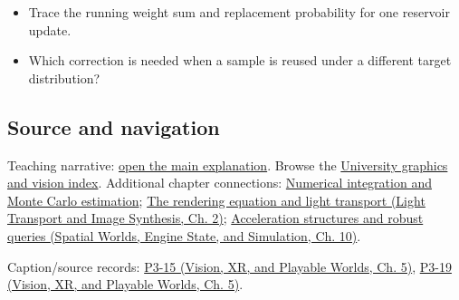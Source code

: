 \begin{itemize}
\tightlist
\item
  Trace the running weight sum and replacement probability for one reservoir update.
\item
  Which correction is needed when a sample is reused under a different target distribution?
\end{itemize}

\subsection{Source and navigation}\label{appendix-68be451b78b1-source-and-navigation}

Teaching narrative: \hyperref[03-visual-computing-i-ch012-numerical-integration-and-monte-carlo-estimation]{open the main explanation}. Browse the \hyperref[appendix-a6d556a4ef50-university-graphics-vision-and-photography---independent-series]{University graphics and vision index}. Additional chapter connections: \hyperref[03-visual-computing-i-ch012-numerical-integration-and-monte-carlo-estimation]{Numerical integration and Monte Carlo estimation}; \href{../04-Light-Transport-and-Image-Synthesis/main.pdf\#nameddest=03-visual-computing-i-ch007-the-rendering-equation-and-light-transport}{The rendering equation and light transport (Light Transport and Image Synthesis, Ch. 2)}; \href{../05-Spatial-Worlds-Engine-State-and-Simulation/main.pdf\#nameddest=04-visual-computing-ii-ch029-acceleration-structures-and-robust-queries-1}{Acceleration structures and robust queries (Spatial Worlds, Engine State, and Simulation, Ch. 10)}.

Caption/source records: \href{../07-Vision-XR-and-Playable-Worlds/main.pdf\#nameddest=04-visual-computing-ii-ch036-p3-15---ray-tracing}{P3-15 (Vision, XR, and Playable Worlds, Ch. 5)}, \href{../07-Vision-XR-and-Playable-Worlds/main.pdf\#nameddest=04-visual-computing-ii-ch036-p3-19---shadows-part-2}{P3-19 (Vision, XR, and Playable Worlds, Ch. 5)}.
